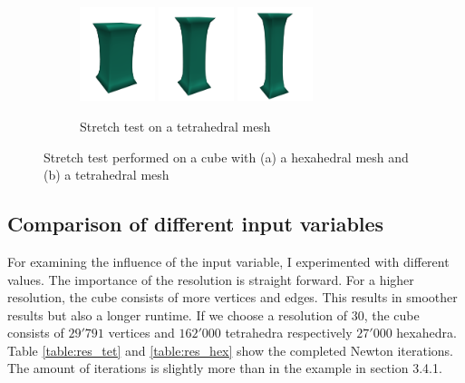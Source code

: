 \begin{figure}[!htbp]
\begin{subfigure}[b]{\textwidth}
        \hfill
        \includegraphics[width=0.24\textwidth]{resources/tetcli_08.png}
        \hfill
        \includegraphics[width=0.24\textwidth]{resources/tetcli_16.png}
        \hfill
        \includegraphics[width=0.24\textwidth]{resources/tetcli_24.png}
        \caption{Stretch test on a tetrahedral mesh}
    \end{subfigure}
    \caption[Stretch test performed on a cube]{Stretch test performed on a cube with (a) a hexahedral mesh and (b) a tetrahedral mesh}
    \label{fig:stretchtest}
\end{figure}

\subsection{Comparison of different input variables}
For examining the influence of the input variable, I experimented with different values. The importance of the resolution is straight forward. For a higher resolution, the cube consists of more vertices and edges. This results in smoother results but also a longer runtime. If we choose a resolution of $30$, the cube consists of $29'791$ vertices and $162'000$ tetrahedra respectively $27'000$ hexahedra. Table \ref{table:res_tet} and \ref{table:res_hex} show the completed Newton iterations. The amount of iterations is slightly more than in the example in section 3.4.1.

